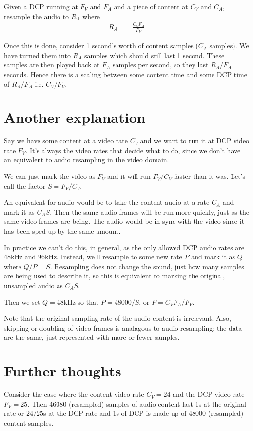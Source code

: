 \documentclass{article}
\begin{document}
Given a DCP running at $F_V$ and $F_A$ and a piece of content at $C_V$
and $C_A$, resample the audio to $R_A$ where
\begin{align*}
R_A &= \frac{C_V F_A}{F_V}
\end{align*}

Once this is done, consider 1 second's worth of content samples ($C_A$
samples).  We have turned them into $R_A$ samples which should still
last 1 second.  These samples are then played back at $F_A$ samples
per second, so they last $R_A / F_A$ seconds.  Hence there is a
scaling between some content time and some DCP time of $R_A / F_A$
i.e. $C_V / F_V$.


\section{Another explanation}

Say we have some content at a video rate $C_V$ and we want to
run it at DCP video rate $F_V$.  It's always the video rates that
decide what to do, since we don't have an equivalent to audio
resampling in the video domain.

We can just mark the video as $F_V$ and it will run $F_V / C_V$ faster
than it was.  Let's call the factor $S = F_V / C_V$.

An equivalent for audio would be to take the content audio at a rate
$C_A$ and mark it as $C_A S$.  Then the same audio frames will be run
more quickly, just as the same video frames are being.  The audio would be
in sync with the video since it has been sped up by the same amount.

In practice we can't do this, in general, as the only allowed DCP
audio rates are 48kHz and 96kHz.  Instead, we'll resample to some new
rate $P$ and mark it as $Q$ where $Q / P = S$.  Resampling does not
change the sound, just how many samples are being used to describe it,
so this is equivalent to marking the original, unsampled audio as $C_A S$.

Then we set $Q = 48$kHz so that $P = 48000 / S$, or $P = C_V F_A
/ F_V$.

Note that the original sampling rate of the audio content is
irrelevant.  Also, skipping or doubling of video frames is analagous
to audio resampling: the data are the same, just represented with more
or fewer samples.


\section{Further thoughts}

Consider the case where the content video rate $C_V = 24$ and the DCP
video rate $F_V = 25$.  Then 46080 (resampled) samples of audio
content last 1s at the original rate or $24/25$s at the DCP rate and
1s of DCP is made up of 48000 (resampled) content samples.
\end{document}
